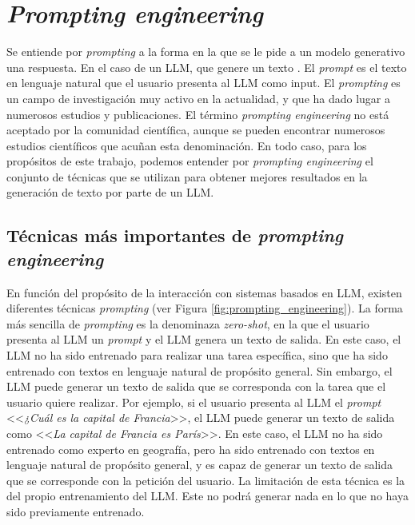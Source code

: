 \section{\textit{Prompting engineering}}

\label{sec:llm_tecnicas_prompting}

Se entiende por \textit{prompting} a la forma en la que se le pide a un modelo generativo una respuesta. En el caso de un LLM, que genere un texto \citep{LLMPromptingGuide}. El \textit{prompt} es el texto en lenguaje natural que el usuario presenta al LLM como input. El \textit{prompting} es un campo de investigación muy activo en la actualidad, y que ha dado lugar a numerosos estudios y publicaciones. El término \textit{prompting engineering} no está aceptado por la comunidad científica, aunque se pueden encontrar numerosos estudios científicos que acuñan esta denominación. En todo caso, para los propósitos de este trabajo, podemos entender por \textit{prompting engineering} el conjunto de técnicas que se utilizan para obtener mejores resultados en la generación de texto por parte de un LLM. 

\subsection{Técnicas más importantes de \textit{prompting engineering}}

En función del propósito de la interacción con sistemas basados en LLM, existen diferentes técnicas \textit{prompting} (ver Figura \ref{fig:prompting_engineering}). La forma más sencilla de \textit{prompting} es la denominaza \textit{zero-shot}, en la que el usuario presenta al LLM un \textit{prompt} y el LLM genera un texto de salida. En este caso, el LLM no ha sido entrenado para realizar una tarea específica, sino que ha sido entrenado con textos en lenguaje natural de propósito general. Sin embargo, el LLM puede generar un texto de salida que se corresponda con la tarea que el usuario quiere realizar. Por ejemplo, si el usuario presenta al LLM el \textit{prompt} <<\textit{¿Cuál es la capital de Francia}>>, el LLM puede generar un texto de salida como <<\textit{La capital de Francia es París}>>. En este caso, el LLM no ha sido entrenado como experto en geografía, pero ha sido entrenado con textos en lenguaje natural de propósito general, y es capaz de generar un texto de salida que se corresponde con la petición del usuario. La limitación de esta técnica es la del propio entrenamiento del LLM. Este no podrá generar nada en lo que no haya sido previamente entrenado.

